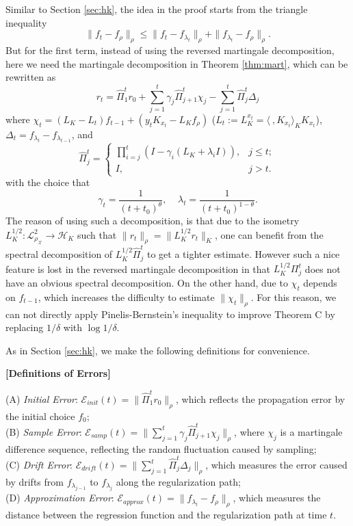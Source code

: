 \documentclass[twoside,11pt]{amsart}
\theoremstyle{theorem}
\theoremstyle{definition}
\theoremstyle{remark}
\newcommand{\DS}{\displaystyle}
\def\<{{\langle}}
\def\>{{\rangle}}
\def\L{{\mathscr L}}
\def\L2{{\mathscr L}^2_{\rho_\X}}
\def\H{{\mathscr H}}
\def\X{{\mathscr X}}
\def\PPi{{\hat{\Pi}}}
\def\Err{{\mathscr E}}
\def\t{t_0}
\def\la{\lambda}
\begin{document}
Similar to Section \ref{sec:hk}, the idea in the proof starts from the triangle inequality 
\[\|f_t - f_\rho\|_\rho \leq \|f_t - f_{\la_t}\|_\rho+\|f_{\la_t} - f_\rho\|_\rho. \] 
But for the first term, instead of using the reversed martingale decomposition, here we need the martingale decomposition in Theorem \ref{thm:mart}, 
which can be rewritten as
\[ r_{t} = \PPi_1^t r_0 + \sum_{j=1}^t \gamma_j \PPi_{j+1}^t \chi_j - \sum_{j=1}^t \PPi_{j}^t \Delta_j \]
where $\chi_t=( L_K-L_t ) f_{t-1} +( y_t K_{x_t}-L_K f_\rho )$ ($L_t:=L_K^{x_t}=\<\ ,K_{x_t}\>_K K_{x_t}$), $\Delta_t = f_{\la_t} - f_{\la_{t-1}}$, and
\begin{equation} 
\PPi_j^t=
\left\{
\begin{array}{lr}
\DS \prod_{i=j}^t \left( I - \gamma_i  (L_K + \la_i I)  \right), & j\leq t; \\
I, & j>t.
\end{array}
\right.
\end{equation}
with the choice that
\[ \gamma_t = \frac{1}{(t+\t)^{\theta}}, \ \ \ \ \ \lambda_t = \frac{1}{(t+\t)^{1-\theta}} .\]
The reason of using such a decomposition, is that due to the isometry $L_K^{1/2}:\L2 \to \H_K$ such that $\|r_t\|_\rho=\|L_K^{1/2} r_t \|_K$, 
one can benefit from the spectral decomposition of $L_K^{1/2}\PPi_j^t$ to get a tighter estimate. However such a nice feature is lost in the reversed 
martingale decomposition in that $L_K^{1/2} \Pi_j^t$ does not have an obvious spectral decomposition. On the other hand, due to $\chi_t$ depends on 
$f_{t-1}$, which increases the difficulty to estimate $\|\chi_t\|_\rho$. For this reason, we can not directly apply Pinelis-Bernstein's inequality to improve 
Theorem C by replacing $1/\delta$ with $\log 1/\delta$. 

As in Section \ref{sec:hk}, we make the following definitions for convenience.

{\bf [Definitions of Errors]}

\noindent (A) \emph{Initial Error}: $\Err_{init}(t)=\|\PPi_1^t r_0\|_\rho $, which reflects the propagation error by the initial choice $f_0$; \\
\noindent (B) \emph{Sample Error}: $\Err_{samp}(t)=\|\sum_{j=1}^t \gamma_j \PPi_{j+1}^t \chi_j \|_\rho $, where $\chi_j$ 
is a martingale difference sequence, reflecting the random fluctuation caused by sampling; \\
\noindent (C) \emph{Drift Error}: $\Err_{drift}(t)= \|\sum_{j=1}^t \PPi_{j}^t \Delta_j\|_\rho $, which measures the error caused by drifts from 
$f_{\la_{j-1}}$ to $f_{\la_j}$ along the regularization path; \\
\noindent (D) \emph{Approximation Error}: $\Err_{approx}(t)=\|f_{\la_t} - f_\rho\|_\rho$, which measures the distance between the regression function and
the regularization path at time $t$.
\end{document}

